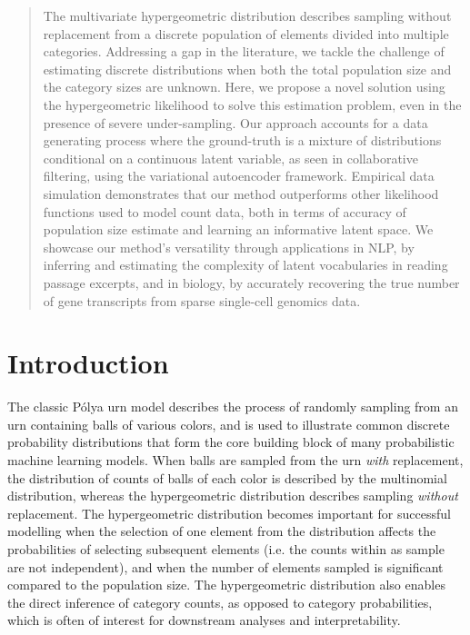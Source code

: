 \documentclass{article}
\theoremstyle{plain}
\theoremstyle{definition}
\theoremstyle{remark}
\begin{document}
\printAffiliationsAndNotice{} %

\begin{abstract}
The multivariate hypergeometric distribution describes sampling without replacement from a discrete population of elements divided into multiple categories.
Addressing a gap in the literature, we tackle the challenge of estimating discrete distributions when both the total population size and the category sizes are unknown.
Here, we propose a novel solution using the hypergeometric likelihood to solve this estimation problem, even in the presence of severe under-sampling.
Our approach accounts for a data generating process where the ground-truth is a mixture of distributions conditional on a continuous latent variable, as seen in collaborative filtering, using the variational autoencoder framework.
Empirical data simulation demonstrates that our method outperforms other likelihood functions used to model count data, both in terms of accuracy of population size estimate and learning an informative latent space.
We showcase our method's versatility through applications in NLP, by inferring and estimating the complexity of latent vocabularies in reading passage excerpts, and in biology, by accurately recovering the true number of gene transcripts from sparse single-cell genomics data.
\end{abstract}

\section{Introduction}
The classic Pólya urn model \citep{eggenberger_uber_1923} describes the process of randomly sampling from an urn containing balls of various colors, and is used to illustrate common discrete probability distributions that form the core building block of many probabilistic machine learning models. When balls are sampled from the urn \textit{with} replacement, the distribution of counts of balls of each color is described by the multinomial distribution, whereas the hypergeometric distribution describes sampling \textit{without} replacement. The hypergeometric distribution becomes important for successful modelling when the selection of one element from the distribution affects the probabilities of selecting subsequent elements (i.e. the counts within as sample are not independent), and when the number of elements sampled is significant compared to the population size. The hypergeometric distribution also enables the direct inference of category counts, as opposed to category probabilities, which is often of interest for downstream analyses and interpretability.
\end{document}
